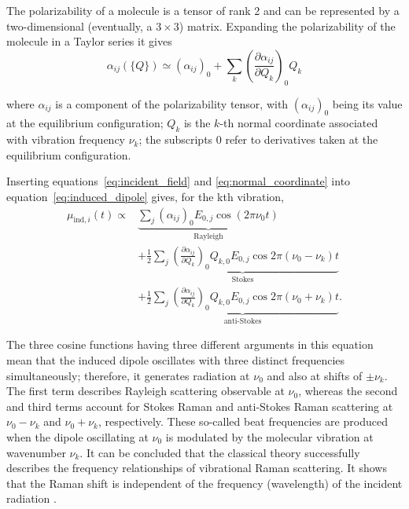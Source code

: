 The polarizability of a molecule is a tensor of rank 2 and can be represented by a
two-dimensional (eventually, a \(3 \times 3\)) matrix. 
Expanding the polarizability of the molecule in a Taylor series it gives
\begin{equation}
    \alpha_{ij}(\{Q\}) \simeq
    \left(\alpha_{ij}\right)_0 +
    \sum_k
    \left(\frac{\partial \alpha_{ij}}{\partial Q_k}\right)_0 Q_k  
    \label{eq:polarizability_taylor}
\end{equation}

where \(\alpha_{ij}\) is a component of the polarizability tensor, with
\((\alpha_{ij})_0\) being its value at the equilibrium configuration;
\(Q_k\) is the \(k\)-th normal coordinate associated with vibration frequency
\(\nu_k\); the subscripts \(0\) refer to derivatives taken at the equilibrium configuration.

Inserting equations~\eqref{eq:incident_field} and \eqref{eq:normal_coordinate} into equation~\eqref{eq:induced_dipole} gives, for
the kth vibration,
\begin{equation}
\begin{aligned}
    \mu_{\mathrm{ind},i}(t) \propto {}&
    \underbrace{\sum_j \left(\alpha_{ij}\right)_0 E_{0,j} \cos(2\pi \nu_0 t)}_{\text{Rayleigh}} \\
    &+
    \underbrace{\frac{1}{2}\sum_j
    \left(\frac{\partial \alpha_{ij}}{\partial Q_k}\right)_0
    Q_{k,0}E_{0,j}
    \cos 2\pi(\nu_0-\nu_k)t}_{\text{Stokes}} \\
    &+
    \underbrace{\frac{1}{2}\sum_j
    \left(\frac{\partial \alpha_{ij}}{\partial Q_k}\right)_0
    Q_{k,0}E_{0,j}
    \cos 2\pi(\nu_0+\nu_k)t}_{\text{anti-Stokes}} .
\end{aligned}
\label{eq:induced_dipole_components}
\end{equation}

The three cosine functions having three different arguments in this equation mean that the induced dipole oscillates with three distinct frequencies simultaneously; therefore, it generates radiation at \(\nu_0\) and also at shifts of \(\pm \nu_k\). The first term describes Rayleigh scattering observable at \(\nu_0\), whereas the second and third terms account for Stokes Raman and anti-Stokes Raman scattering at \(\nu_0 - \nu_k\) and \(\nu_0 + \nu_k\), respectively. These so-called beat frequencies are produced when the dipole oscillating at \(\nu_0\) is modulated by the molecular vibration at wavenumber \(\nu_k\). It can be concluded that the classical theory successfully describes the frequency relationships of vibrational Raman scattering. It shows that the Raman shift is independent of
the frequency (wavelength) of the incident radiation \cite{keresztury2002raman}. 

